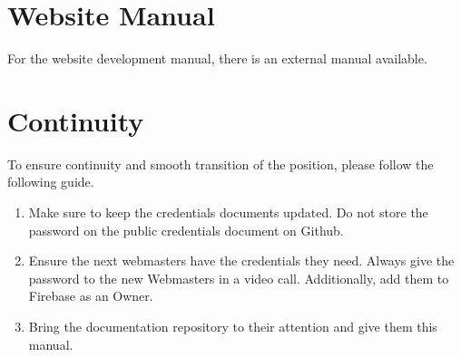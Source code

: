 \documentclass[a4paper]{article}
\begin{document}
\section{Website Manual}
For the website development manual, there is an external manual available.

\section{Continuity}
To ensure continuity and smooth transition of the position, please follow the following guide.
\begin{enumerate}
  \item Make sure to keep the credentials documents updated. Do not store the password on the public credentials document on Github.
  \item Ensure the next webmasters have the credentials they need. Always give the password to the new Webmasters in a video call. Additionally, add them to Firebase as an Owner.
  \item Bring the documentation repository to their attention and give them this manual.
\end{enumerate}

\end{document}
